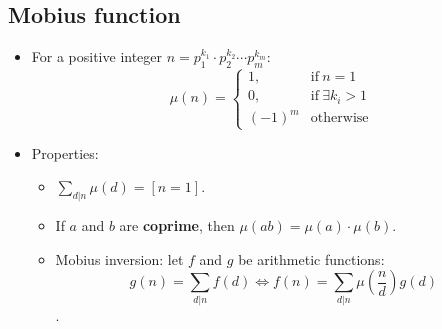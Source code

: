 \subsection{Mobius function}
\begin{itemize}
	\item For a positive integer $n = p_1^{k_1} \cdot p_2^{k_2} \cdots p_m^{k_m}$:
		\[
		\mu(n) =
		\begin{cases}
			1, & \text{if}\ n = 1\\
			0, & \text{if}\ \exists k_i > 1\\
			(-1)^{m} & \text{otherwise}
		\end{cases}
		\]
	\item Properties:
	\begin{itemize}
		\item $\sum\limits_{d | n} \mu(d) = [n = 1]$.
		\item If $a$ and $b$ are \textbf{coprime}, then $\mu(ab) = \mu(a) \cdot \mu(b)$.
		\item Mobius inversion: let $f$ and $g$ be arithmetic functions:
		\[ g(n) = \sum\limits_{d | n} f(d) \Leftrightarrow f(n) = \sum\limits_{d | n} \mu\left(\dfrac{n}{d}\right) g(d) \].
	\end{itemize}
\end{itemize}


